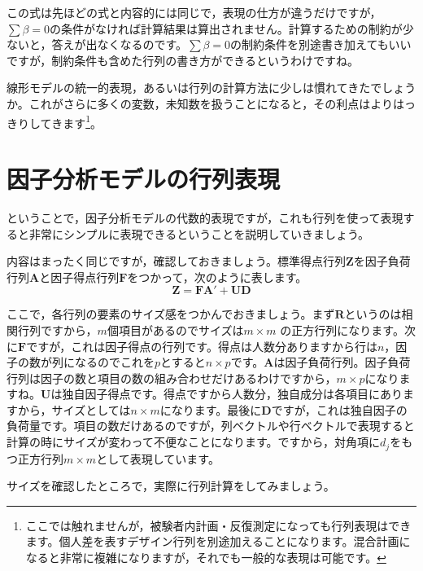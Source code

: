 \documentclass{ltjsbook}
\begin{document}
この式は先ほどの式と内容的には同じで，表現の仕方が違うだけですが，$\sum \beta= 0$の条件がなければ計算結果は算出されません。計算するための制約が少ないと，答えが出なくなるのです。$\sum \beta= 0$の制約条件を別途書き加えてもいいですが，制約条件も含めた行列の書き方ができるというわけですね。

線形モデルの統一的表現，あるいは行列の計算方法に少しは慣れてきたでしょうか。これがさらに多くの変数，未知数を扱うことになると，その利点はよりはっきりしてきます\footnote{ここでは触れませんが，被験者内計画・反復測定になっても行列表現はできます。個人差を表すデザイン行列を別途加えることになります。混合計画になると非常に複雑になりますが，それでも一般的な表現は可能です。}。

\section{ 因子分析モデルの行列表現}
ということで，因子分析モデルの代数的表現ですが，これも行列を使って表現すると非常にシンプルに表現できるということを説明していきましょう。

内容はまったく同じですが，確認しておきましょう。標準得点行列$\bm{Z}$を因子負荷行列$\bm{A}$と因子得点行列$\bm{F}$をつかって，次のように表します。
\begin{equation}
	\bm{Z} = \bm{F} \bm{A} ' + \bm{U} \bm{D}
\end{equation}

ここで，各行列の要素のサイズ感をつかんでおきましょう。まず$\bm{R}$というのは相関行列ですから，$m$個項目があるのでサイズは$m \times m$ の正方行列になります。次に$\bm{F}$ですが，これは因子得点の行列です。得点は人数分ありますから行は$n$，因子の数が列になるのでこれを$p$とすると$n\times p$です。$\bm{A}$は因子負荷行列。因子負荷行列は因子の数と項目の数の組み合わせだけあるわけですから，$m \times p$になりますね。$\bm{U}$は独自因子得点です。得点ですから人数分，独自成分は各項目にありますから，サイズとしては$n \times m$になります。最後に$\bm{D}$ですが，これは独自因子の負荷量です。項目の数だけあるのですが，列ベクトルや行ベクトルで表現すると計算の時にサイズが変わって不便なことになります。ですから，対角項に$d_j$をもつ正方行列$m \times m$として表現しています。

サイズを確認したところで，実際に行列計算をしてみましょう。
\end{document}

